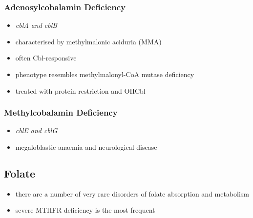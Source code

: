 \documentclass{scrartcl}
\begin{document}
\subsubsection{Adenosylcobalamin Deficiency}
\label{sec:org27ccd40}
\begin{itemize}
\item \emph{cblA and cblB}
\item characterised by methylmalonic aciduria (MMA)
\item often Cbl-responsive
\item phenotype resembles methylmalonyl-CoA mutase deficiency
\item treated with protein restriction and OHCbl
\end{itemize}

\subsubsection{Methylcobalamin Deficiency}
\label{sec:orgcc916c5}
\begin{itemize}
\item \emph{cblE and cblG}
\item megaloblastic anaemia and neurological disease
\end{itemize}
\subsection{Folate}
\label{sec:org1a0b582}
\begin{itemize}
\item there are a number of very rare disorders of folate absorption and metabolism
\item severe MTHFR deficiency is the most frequent
\end{itemize}
\end{document}
